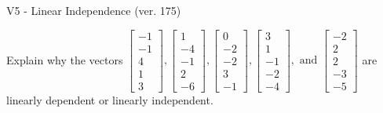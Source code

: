 \begin{exercise}
  \begin{exerciseTitle}V5 - Linear Independence (ver. 175)\end{exerciseTitle}
  \begin{exerciseStatement}
    Explain why the vectors \(\left[\begin{array}{r}
-1 \\
-1 \\
4 \\
1 \\
3
\end{array}\right] , \left[\begin{array}{r}
1 \\
-4 \\
-1 \\
2 \\
-6
\end{array}\right] , \left[\begin{array}{r}
0 \\
-2 \\
-2 \\
3 \\
-1
\end{array}\right] , \left[\begin{array}{r}
3 \\
1 \\
-1 \\
-2 \\
-4
\end{array}\right] , \text{ and } \left[\begin{array}{r}
-2 \\
2 \\
2 \\
-3 \\
-5
\end{array}\right]\) are linearly dependent or linearly independent.	



\end{exerciseStatement}
\end{exercise}
